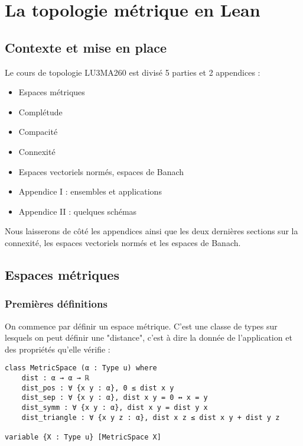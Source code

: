 \documentclass[a4paper, 12pt]{article}
\begin{document}
\newpage
\section{La topologie métrique en Lean}

\subsection{Contexte et mise en place}

Le cours de topologie LU3MA260\cite{topology_memo} est divisé 5 parties et 2 appendices :

\begin{itemize}
    \item Espaces métriques
    \item Complétude
    \item Compacité
    \item Connexité
    \item Espaces vectoriels normés, espaces de Banach
    \item Appendice I : ensembles et applications
    \item Appendice II : quelques schémas
\end{itemize}

Nous laisserons de côté les appendices ainsi que les deux dernières sections sur la connexité, les espaces vectoriels normés et les espaces de Banach.

\subsection{Espaces métriques}

\subsubsection{Premières définitions}

On commence par définir un espace métrique. C'est une classe de types sur lesquels on peut définir une "distance", c'est à dire la donnée de l'application et des propriétés qu'elle vérifie :

\begin{verbatim}
class MetricSpace (α : Type u) where
    dist : α → α → ℝ
    dist_pos : ∀ {x y : α}, 0 ≤ dist x y
    dist_sep : ∀ {x y : α}, dist x y = 0 ↔ x = y
    dist_symm : ∀ {x y : α}, dist x y = dist y x
    dist_triangle : ∀ {x y z : α}, dist x z ≤ dist x y + dist y z

variable {X : Type u} [MetricSpace X]
\end{verbatim}
\end{document}

